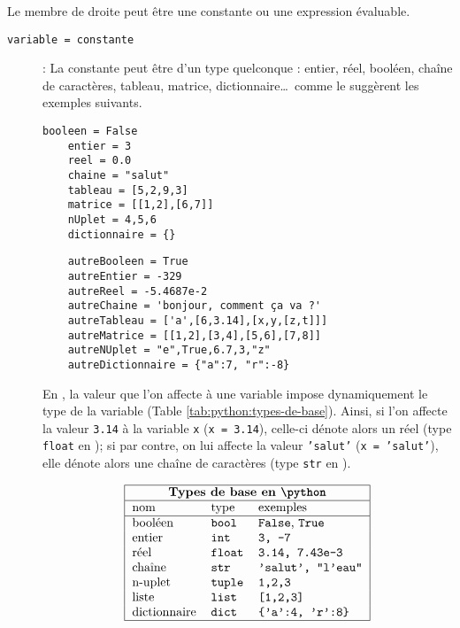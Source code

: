 Le membre de droite peut être une constante ou une expression évaluable.
\begin{description}
\item[\texttt{variable = constante}] : La constante peut être d'un type quelconque :
	entier, réel, booléen, chaîne de caractères, tableau, matrice, dictionnaire\ldots\ 
	comme le suggèrent les exemples suivants.

	\begin{minipage}[t]{5.5cm}
	\begin{verbatim}booleen = False
	entier = 3
	reel = 0.0
	chaine = "salut"
	tableau = [5,2,9,3]
	matrice = [[1,2],[6,7]]
	nUplet = 4,5,6
	dictionnaire = {}
	\end{verbatim}
	\end{minipage}
	\hfill
	\begin{minipage}[t]{9cm}
	\begin{verbatim}
	autreBooleen = True
	autreEntier = -329
	autreReel = -5.4687e-2
	autreChaine = 'bonjour, comment ça va ?'
	autreTableau = ['a',[6,3.14],[x,y,[z,t]]]
	autreMatrice = [[1,2],[3,4],[5,6],[7,8]]
	autreNUplet = "e",True,6.7,3,"z"
	autreDictionnaire = {"a":7, "r":-8}
	\end{verbatim}
	\end{minipage}
	\vspace*{2mm}
	
	En \python, la valeur que l'on affecte à une variable impose dynamiquement
	le type de la variable (Table \ref{tab:python:types-de-base}). Ainsi,
	si l'on affecte la valeur \texttt{3.14} à la variable \texttt{x} (\texttt{x = 3.14}), 
	celle-ci dénote alors un réel (type \texttt{float} en \python); si par contre,
	on lui affecte la valeur \texttt{'salut'} (\texttt{x = 'salut'}), 
	elle dénote alors une chaîne de caractères (type \texttt{str} en \python).

\begin{table}[ht]
$$\begin{tabular}{|lll|}
\hline
\multicolumn{3}{|c|}{\textbf{Types de base en \python}}\\
\hline
nom & type & exemples \\
\hline
booléen 		& \tt bool 	& {\tt False}, {\tt True}\\
entier  		& \tt int  	& \tt 3, -7\\
réel    		& \tt float & \tt 3.14, 7.43e-3\\
chaîne  		& \tt str 	& \tt 'salut', "l'eau"\\
n-uplet 		& \tt tuple & \tt 1,2,3\\
liste   		& \tt list  & \tt [1,2,3] \\
dictionnaire 	& \tt dict 	& \tt \{'a':4, 'r':8\}\\
\hline
\end{tabular}$$
\caption{Principaux types de base en \python}
\label{tab:python:types-de-base}
\end{table}


\end{description}
